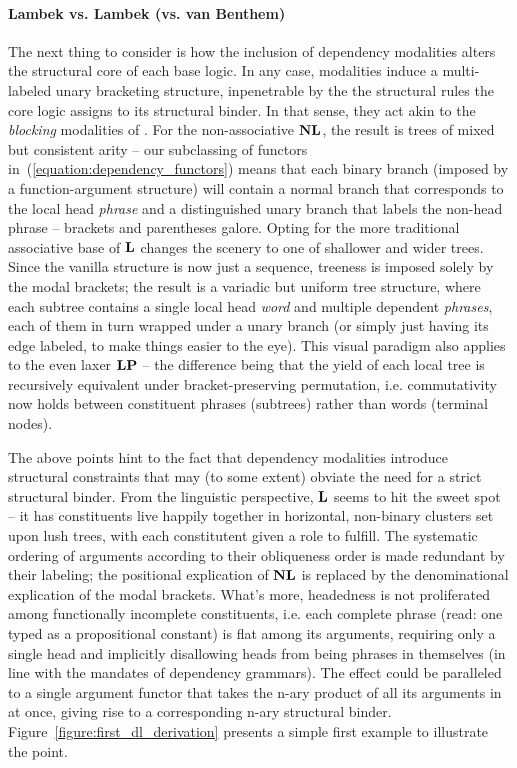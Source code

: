 \paragraph{Lambek vs. Lambek (vs. van Benthem)}
The next thing to consider is how the inclusion of dependency modalities alters the structural core of each base logic.
In any case, modalities induce a multi-labeled unary bracketing structure, inpenetrable by the the structural rules the core logic assigns to its structural binder.
In that sense, they act akin to the \textit{blocking} modalities of \citet{morrill2012type}.
For the non-associative $\textbf{NL}$, the result is trees of mixed but consistent arity -- our subclassing of functors in~(\ref{equation:dependency_functors}) means that each binary branch (imposed by a function-argument structure) will contain a normal branch that corresponds to the local head \textit{phrase} and a distinguished unary branch that labels the non-head phrase -- brackets and parentheses galore.
Opting for the more traditional associative base of $\textbf{L}$ changes the scenery to one of shallower and wider trees.
Since the vanilla structure is now just a sequence, treeness is imposed solely by the modal brackets; the result is a variadic but uniform tree structure, where each subtree contains a single local head  \textit{word} and multiple dependent \textit{phrases}, each of them in turn wrapped under a unary branch (or simply just having its edge labeled, to make things easier to the eye).
This visual paradigm also applies to the even laxer $\textbf{LP}$ -- the difference being that the yield of each local tree is recursively equivalent under bracket-preserving permutation, i.e. commutativity now holds between constituent phrases (subtrees) rather than words (terminal nodes).

The above points hint to the fact that dependency modalities introduce structural constraints that may (to some extent) obviate the need for a strict structural binder.
From the linguistic perspective, $\textbf{L}$ seems to hit the sweet spot -- it has constituents live happily together in horizontal, non-binary clusters set upon lush trees, with each constitutent given a role to fulfill.
The systematic ordering of arguments according to their obliqueness order is made redundant by their labeling; the positional explication of $\textbf{NL}$ is replaced by the denominational explication of the modal brackets.
What's more, headedness is not proliferated among functionally incomplete constituents, i.e. each complete phrase (read: one typed as a propositional constant) is flat among its arguments, requiring only a single head and implicitly disallowing heads from being phrases in themselves (in line with the mandates of dependency grammars). 
The effect could be paralleled to a single argument functor that takes the n-ary product of all its arguments in at once, giving rise to a corresponding n-ary structural binder.
Figure~\ref{figure:first_dl_derivation} presents a simple first example to illustrate the point.

